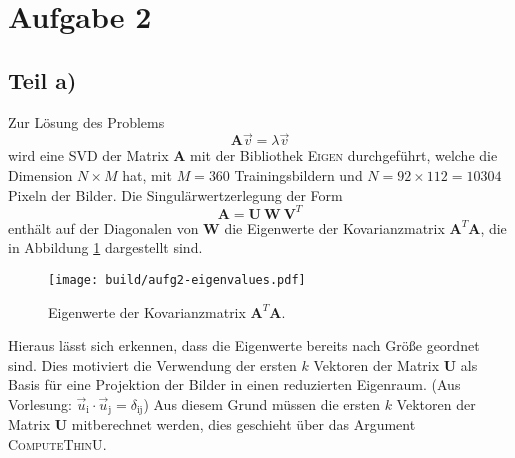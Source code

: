 \section*{Aufgabe 2}

\subsection*{Teil a)}

Zur Lösung des Problems
\begin{equation*}
  \mathbf{A} \vec{v} = \lambda \vec{v}
\end{equation*}
wird eine SVD der Matrix $\mathbf{A}$ mit der Bibliothek \textsc{Eigen} durchgeführt,
welche die Dimension $N \times M$ hat,
mit $M = 360$ Trainingsbildern und $N = 92 \times 112 = 10304$ Pixeln der Bilder.
Die Singulärwertzerlegung der Form
\begin{equation*}
  \mathbf{A} = \mathbf{U}\: \mathbf{W}\: \mathbf{V}^T
\end{equation*}
enthält auf der Diagonalen von $\mathbf{W}$ die Eigenwerte der
Kovarianzmatrix $\mathbf{A}^T \mathbf{A}$,
die in Abbildung \ref{fig:Eigenwertspektrum} dargestellt sind.
\begin{figure}
  \centering
  \texttt{[image: build/aufg2-eigenvalues.pdf]}
  \caption{Eigenwerte der Kovarianzmatrix $\mathbf{A}^T \mathbf{A}$.}
  \label{fig:Eigenwertspektrum}
\end{figure}
Hieraus lässt sich erkennen, dass die Eigenwerte bereits nach Größe geordnet sind.
Dies motiviert die Verwendung der ersten $k$ Vektoren der Matrix $\mathbf{U}$
als Basis für eine Projektion der Bilder in einen reduzierten Eigenraum.
(Aus Vorlesung: $\vec{u}_\text{i} \cdot \vec{u}_\text{j} = \delta_\text{ij}$)
Aus diesem Grund müssen die ersten $k$ Vektoren der Matrix $\mathbf{U}$ mitberechnet
werden, dies geschieht über das Argument \textsc{ComputeThinU}.

